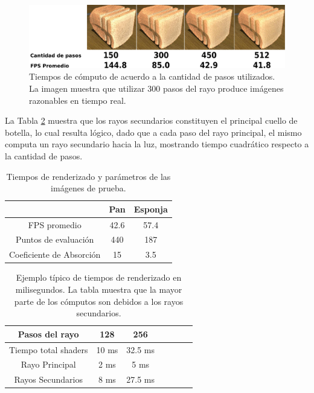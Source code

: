\begin{figure}
  \centerline{\includegraphics[width=13cm]{figures/stepcount}}
  \caption[Tiempos de cómputo de acuerdo a la cantidad de pasos utilizados]{Tiempos de cómputo de acuerdo a la cantidad de pasos utilizados. La imagen muestra que utilizar $300$ pasos del rayo produce imágenes razonables en tiempo real.}
  \label{fg:stepcount}
\end{figure}

La Tabla \ref{tab:rayossecundarios} muestra que los rayos secundarios constituyen el principal cuello de botella, lo cual resulta lógico, dado que a cada paso del rayo principal, el mismo computa un rayo secundario hacia la luz, mostrando tiempo cuadrático respecto a la cantidad de pasos.


\begin{table}[htb]
\centering
\begin{tabular}{|c|c|c|}
\hline &  Pan & Esponja \\
\hline
\hline
 FPS promedio & 42.6 & 57.4\\
\hline
 Puntos de evaluación &  440  & 187 \\
\hline
 Coeficiente de Absorción &  15  & 3.5 \\
\hline
\end{tabular}
\caption{Tiempos de renderizado y parámetros de las imágenes de prueba.}
\label{tab:tiemposrenderizado}
\end{table}

\begin{table}[htb]
\centering
\begin{tabular}{|c|c|c|c|c|c|c|}
\hline
 Pasos del rayo         & 128 &  256 \\
\hline
\hline
 Tiempo total shaders   & 10 ms &  32.5 ms \\
\hline
 Rayo Principal         & 2 ms  & 5 ms  \\
\hline
 Rayos Secundarios      &  8 ms & 27.5 ms  \\
\hline
\end{tabular}
\caption[Tiempos de renderizado en milisegundos]{Ejemplo típico de tiempos de renderizado en milisegundos. La tabla muestra que la mayor parte de los cómputos son debidos a los rayos secundarios.}
\label{tab:rayossecundarios}
\end{table}


